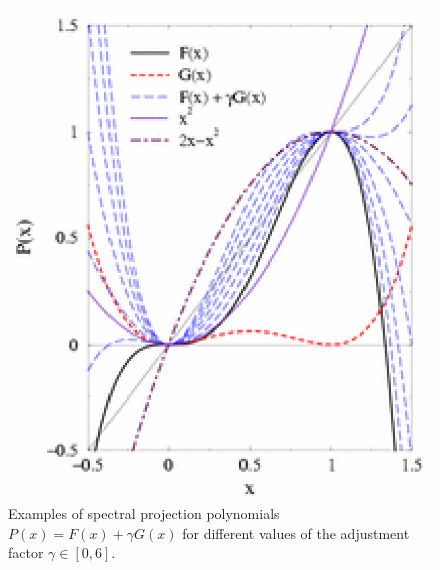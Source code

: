 \commentoutA{\documentclass[prb,aps,twocolumn,twocolumngrid,secnumarabic,superbib,hyperref]{revtex4}}
\begin{document}
\begin{figure}[!]
\caption{Examples of spectral projection polynomials $P(x) = F(x) + \gamma G(x)$
for different values of the adjustment factor $\gamma \in [0,6]$.} 
\includegraphics{TP_Fig_F_G_small.eps}
\end{figure}
\end{document}
